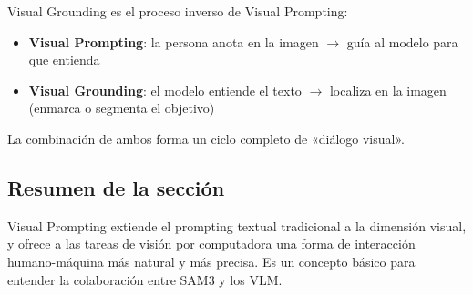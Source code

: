Visual Grounding es el proceso inverso de Visual Prompting:
\begin{itemize}
    \item \textbf{Visual Prompting}: la persona anota en la imagen $\rightarrow$ guía al modelo para que entienda
    \item \textbf{Visual Grounding}: el modelo entiende el texto $\rightarrow$ localiza en la imagen (enmarca o segmenta el objetivo)
\end{itemize}

La combinación de ambos forma un ciclo completo de «diálogo visual».

\subsection{Resumen de la sección}

Visual Prompting extiende el prompting textual tradicional a la dimensión visual, y ofrece a las tareas de visión por computadora una forma de interacción humano-máquina más natural y más precisa. Es un concepto básico para entender la colaboración entre SAM3 y los VLM.


